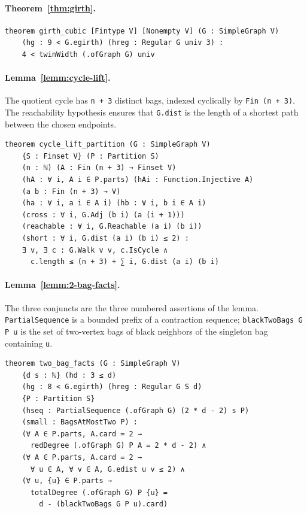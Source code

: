 \par\medskip
\noindent\begin{minipage}{\linewidth}
\paragraph*{Theorem~\ref{thm:girth}.}
\begin{lstlisting}
theorem girth_cubic [Fintype V] [Nonempty V] (G : SimpleGraph V)
    (hg : 9 < G.egirth) (hreg : Regular G univ 3) :
    4 < twinWidth (.ofGraph G) univ
\end{lstlisting}
\end{minipage}
\par\medskip
\noindent\begin{minipage}{\linewidth}
\paragraph*{Lemma~\ref{lemm:cycle-lift}.}
The quotient cycle has \lstinline|n + 3| distinct bags, indexed cyclically
by \lstinline|Fin (n + 3)|. The reachability hypothesis ensures that
\lstinline|G.dist| is the length of a shortest path between the chosen
endpoints.
\begin{lstlisting}
theorem cycle_lift_partition (G : SimpleGraph V)
    {S : Finset V} (P : Partition S)
    (n : ℕ) (A : Fin (n + 3) → Finset V)
    (hA : ∀ i, A i ∈ P.parts) (hAi : Function.Injective A)
    (a b : Fin (n + 3) → V)
    (ha : ∀ i, a i ∈ A i) (hb : ∀ i, b i ∈ A i)
    (cross : ∀ i, G.Adj (b i) (a (i + 1)))
    (reachable : ∀ i, G.Reachable (a i) (b i))
    (short : ∀ i, G.dist (a i) (b i) ≤ 2) :
    ∃ v, ∃ c : G.Walk v v, c.IsCycle ∧
      c.length ≤ (n + 3) + ∑ i, G.dist (a i) (b i)
\end{lstlisting}
\end{minipage}
\par\medskip
\noindent\begin{minipage}{\linewidth}
\paragraph*{Lemma~\ref{lemm:2-bag-facts}.}
The three conjuncts are the three numbered assertions of the lemma.
\lstinline|PartialSequence| is a bounded prefix of a contraction sequence;
\lstinline|blackTwoBags G P u| is the set of two-vertex bags of black
neighbors of the singleton bag containing \lstinline|u|.
\begin{lstlisting}
theorem two_bag_facts (G : SimpleGraph V)
    {d s : ℕ} (hd : 3 ≤ d)
    (hg : 8 < G.egirth) (hreg : Regular G S d)
    {P : Partition S}
    (hseq : PartialSequence (.ofGraph G) (2 * d - 2) s P)
    (small : BagsAtMostTwo P) :
    (∀ A ∈ P.parts, A.card = 2 →
      redDegree (.ofGraph G) P A = 2 * d - 2) ∧
    (∀ A ∈ P.parts, A.card = 2 →
      ∀ u ∈ A, ∀ v ∈ A, G.edist u v ≤ 2) ∧
    (∀ u, {u} ∈ P.parts →
      totalDegree (.ofGraph G) P {u} =
        d - (blackTwoBags G P u).card)
\end{lstlisting}
\end{minipage}
